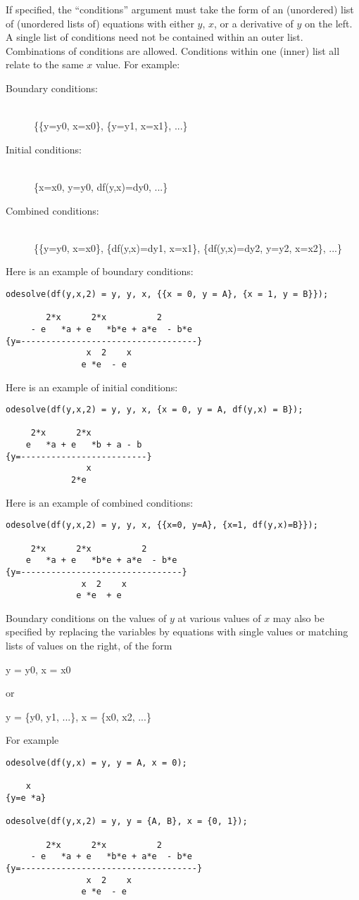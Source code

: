 \documentclass[a4paper]{article} %
\begin{document}
If specified, the ``conditions'' argument must take the form of an
(unordered) list of (unordered lists of) equations with either $y$,
$x$, or a derivative of $y$ on the left.  A single list of conditions
need not be contained within an outer list.  Combinations of
conditions are allowed.  Conditions within one (inner) list all relate
to the same $x$ value.  For example:
\begin{description}
\item[Boundary conditions:] ~ \\
\{\{y=y0, x=x0\}, \{y=y1, x=x1\}, ...\}

\item[Initial conditions:] ~ \\
\{x=x0, y=y0, df(y,x)=dy0, ...\}

\item[Combined conditions:] ~ \\
\{\{y=y0, x=x0\}, \{df(y,x)=dy1, x=x1\}, \{df(y,x)=dy2, y=y2, x=x2\}, ...\}
\end{description}
Here is an example of boundary conditions:
\begin{verbatim}
odesolve(df(y,x,2) = y, y, x, {{x = 0, y = A}, {x = 1, y = B}});

        2*x      2*x          2
     - e   *a + e   *b*e + a*e  - b*e
{y=-----------------------------------}
                x  2    x
               e *e  - e
\end{verbatim}
Here is an example of initial conditions:
\begin{verbatim}
odesolve(df(y,x,2) = y, y, x, {x = 0, y = A, df(y,x) = B});

     2*x      2*x
    e   *a + e   *b + a - b
{y=-------------------------}
                x
             2*e
\end{verbatim}
Here is an example of combined conditions:
\begin{verbatim}
odesolve(df(y,x,2) = y, y, x, {{x=0, y=A}, {x=1, df(y,x)=B}});

     2*x      2*x          2
    e   *a + e   *b*e + a*e  - b*e
{y=--------------------------------}
               x  2    x
              e *e  + e
\end{verbatim}

Boundary conditions on the values of $y$ at various values of $x$ may
also be specified by replacing the variables by equations with single
values or matching lists of values on the right, of the form
\begin{center}
y = y0, x = x0
\end{center}
or
\begin{center}
y = \{y0, y1, ...\}, x = \{x0, x2, ...\}
\end{center}
For example
\begin{verbatim}
odesolve(df(y,x) = y, y = A, x = 0);

    x
{y=e *a}

odesolve(df(y,x,2) = y, y = {A, B}, x = {0, 1});

        2*x      2*x          2
     - e   *a + e   *b*e + a*e  - b*e
{y=-----------------------------------}
                x  2    x
               e *e  - e
\end{verbatim}
\end{document}

